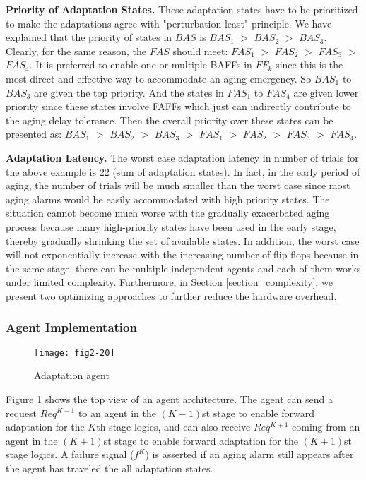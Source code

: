 {\bf Priority of Adaptation States.} These adaptation states have to be prioritized to make the adaptations agree with "perturbation-least" principle. We have explained that the priority of states in $BAS$ is $BAS_1$ $>$ $BAS_2$ $>$ $BAS_3$. Clearly, for the same reason, the $FAS$ should meet: $FAS_1$ $>$ $FAS_2$ $>$ $FAS_3$ $>$ $FAS_4$. It is preferred to enable one or multiple BAFFs in $FF_k$ since this is the most direct and effective way to accommodate an aging emergency. So $BAS_1$ to $BAS_3$ are given the top priority. And the states in $FAS_1$ to $FAS_4$ are given lower priority since these states involve FAFFs which just can indirectly contribute to the aging delay tolerance. Then the overall priority over these states can be presented as: $BAS_1$ $>$ $BAS_2$ $>$ $BAS_3$ $>$ $FAS_1$ $>$ $FAS_2$ $>$ $FAS_3$ $>$ $FAS_4$.

{\bf Adaptation Latency.} The worst case adaptation latency  in number of trials for the above example is 22 (sum of adaptation states). In fact, in the early period of aging, the number of trials will be much smaller than the worst case since most aging alarms would be easily accommodated with high priority states. The situation cannot become much worse with the gradually exacerbated aging process because many high-priority states have been used in the early stage, thereby gradually shrinking the set of available states. In addition, the worst case will not exponentially increase with the increasing number of flip-flops because in the same stage, there can be multiple independent agents and each of them works under limited complexity. Furthermore, in Section \ref{section_complexity}, we present two optimizing approaches to further reduce the hardware overhead.


\subsubsection {Agent Implementation}
\begin{figure}[t]
\centering
\texttt{[image: fig2-20]}%
   \caption{Adaptation agent}\label{agent}
\end{figure}

Figure \ref{agent} shows the top view of an agent architecture. The agent can send a request $Req^{K-1}$ to an agent in the $(K-1)$st stage to enable forward adaptation for the $K$th stage logics, and can also receive $Req^{K+1}$ coming from an agent in the $(K+1)$st stage to enable forward adaptation for the $(K+1)$st stage logics. A failure signal ($f^K$) is asserted if an aging alarm still appears after the agent has traveled the all adaptation states.

